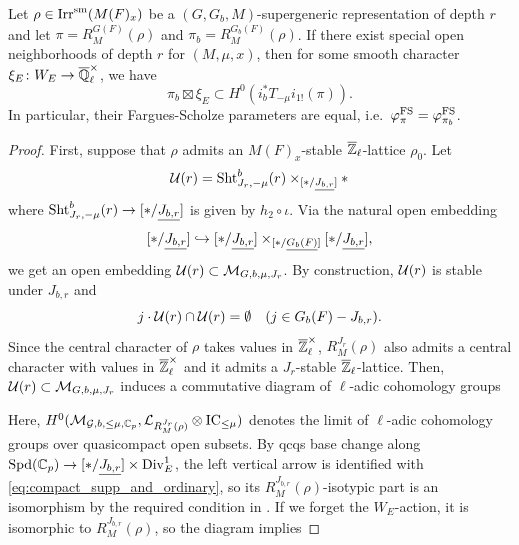 \documentclass[12pt,reqno]{amsart}
\begin{document}
\begin{prop} \label{prop:consequence_Hecke_operator}
    Let $\rho \in {\operatorname{Irr}}^{\operatorname{sm}}(M(F)_x)$ be a $(G, G_b, M)$-supergeneric representation of depth $r$ and let $\pi = R^{G(F)}_M(\rho)$ and $\pi_b =  R^{G_b(F)}_M(\rho)$. If there exist special open neighborhoods of depth $r$ for $(M, \mu, x)$, then for some smooth character $\xi_E \colon W_E \to {\overline{\mathbb{Q}}_\ell^\times}$, we have 
    \[
        \pi_b \boxtimes \xi_E \subset H^0(i_b^* T_{-\mu} i_{1!}(\pi)). 
    \]
    In particular, their Fargues-Scholze parameters are equal, i.e.\ $\varphi^{\operatorname{FS}}_\pi = \varphi^{\operatorname{FS}}_{\pi_b}$. 
\end{prop}
\begin{proof}
    First, suppose that $\rho$ admits an $M(F)_x$-stable $\mathbb{{\overline{Z}}}_\ell$-lattice $\rho_0$. Let 
    \[
        {\mathcal{U}}(r) = {\operatorname{Sht}}_{J_r, -\mu}^b(r) \times_{[\ast / {\underline{J_{b, r}}}]} \ast
    \]
    where ${\operatorname{Sht}}_{J_r, -\mu}^b(r) \to [\ast / {\underline{J_{b, r}}}]$ is given by $h_2 \circ \iota$. Via the natural open embedding 
    \[
        [\ast / {\underline{J_{b, r}}}] \hookrightarrow [\ast / {\underline{J_{b, r}}}] \times_{[\ast / {\underline{G_b(F)}}]} [\ast / {\underline{J_{b, r}}}], 
    \]
    we get an open embedding ${\mathcal{U}}(r) \subset {\mathcal{M}}_{G, b, \mu, J_r}$. By construction, ${\mathcal{U}}(r)$ is stable under $J_{b, r}$ and 
    \[
        j \cdot {\mathcal{U}}(r) \cap {\mathcal{U}}(r) = \emptyset \quad (j \in G_b(F) - J_{b, r}). 
    \]
    Since the central character of $\rho$ takes values in ${\overline{\mathbb{Z}}}_\ell^\times$, $R^{J_r}_M(\rho)$ also admits a central character with values in ${\overline{\mathbb{Z}}}_\ell^\times$ and it admits a $J_r$-stable $\mathbb{{\overline{Z}}}_\ell$-lattice. Then, ${\mathcal{U}}(r) \subset {\mathcal{M}}_{G, b, \mu, J_r}$ induces a commutative diagram of $\ell$-adic cohomology groups
    \begin{center}
    \end{center}
    Here, $H^0({\mathcal{M}}_{{\mathcal{G}}, b, \leq \mu, \mathbb{C}_p}, {\mathcal{L}}_{R^{J_r}_M(\rho)} \otimes {\operatorname{IC}}_{\leq \mu})$ denotes the limit of $\ell$-adic cohomology groups over quasicompact open subsets. By qcqs base change \cite[Proposition 17.6]{Sch17} along ${\operatorname{Spd}}(\mathbb{C}_p) \to [\ast / {\underline{J_{b, r}}}] \times {\operatorname{Div}}^1_E$, the left vertical arrow is identified with \eqref{eq:compact_supp_and_ordinary}, so its $R_M^{J_{b, r}}(\rho)$-isotypic part is an isomorphism by the required condition in . If we forget the $W_E$-action, it is isomorphic to $R^{J_{b, r}}_M(\rho)$, so the diagram implies 

\end{proof}
\end{document}
